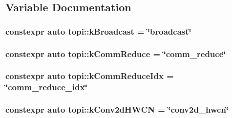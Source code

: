 \subsection{Variable Documentation}
\subsubsection[{\texorpdfstring{k\+Broadcast}{kBroadcast}}]{\setlength{\rightskip}{0pt plus 5cm}constexpr auto topi\+::k\+Broadcast = \char`\"{}broadcast\char`\"{}}\hypertarget{namespacetopi_a794b9155e9ba9d1c9c42a1cff1fb645f}{}\label{namespacetopi_a794b9155e9ba9d1c9c42a1cff1fb645f}
\subsubsection[{\texorpdfstring{k\+Comm\+Reduce}{kCommReduce}}]{\setlength{\rightskip}{0pt plus 5cm}constexpr auto topi\+::k\+Comm\+Reduce = \char`\"{}comm\+\_\+reduce\char`\"{}}\hypertarget{namespacetopi_ae57dced7232a8ef1f94cd669c72e0093}{}\label{namespacetopi_ae57dced7232a8ef1f94cd669c72e0093}
\subsubsection[{\texorpdfstring{k\+Comm\+Reduce\+Idx}{kCommReduceIdx}}]{\setlength{\rightskip}{0pt plus 5cm}constexpr auto topi\+::k\+Comm\+Reduce\+Idx = \char`\"{}comm\+\_\+reduce\+\_\+idx\char`\"{}}\hypertarget{namespacetopi_aaf18db0af5abc7dd13818115bac402bc}{}\label{namespacetopi_aaf18db0af5abc7dd13818115bac402bc}
\subsubsection[{\texorpdfstring{k\+Conv2d\+H\+W\+CN}{kConv2dHWCN}}]{\setlength{\rightskip}{0pt plus 5cm}constexpr auto topi\+::k\+Conv2d\+H\+W\+CN = \char`\"{}conv2d\+\_\+hwcn\char`\"{}}\hypertarget{namespacetopi_a0a63c3748ea82acd5eef2b608c83e165}{}\label{namespacetopi_a0a63c3748ea82acd5eef2b608c83e165}
